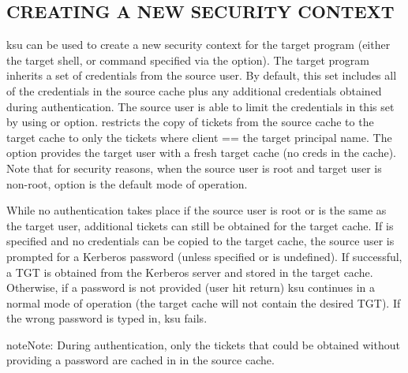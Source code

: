 \documentclass[letterpaper,10pt,english]{sphinxmanual}
\begin{document}
\subsection{CREATING A NEW SECURITY CONTEXT}
\label{\detokenize{user/user_commands/ksu:creating-a-new-security-context}}
ksu can be used to create a new security context for the target
program (either the target shell, or command specified via the 
option).  The target program inherits a set of credentials from the
source user.  By default, this set includes all of the credentials in
the source cache plus any additional credentials obtained during
authentication.  The source user is able to limit the credentials in
this set by using  or  option.   restricts the copy
of tickets from the source cache to the target cache to only the
tickets where client == the target principal name.  The  option
provides the target user with a fresh target cache (no creds in the
cache).  Note that for security reasons, when the source user is root
and target user is non-root,  option is the default mode of
operation.

While no authentication takes place if the source user is root or is
the same as the target user, additional tickets can still be obtained
for the target cache.  If  is specified and no credentials can
be copied to the target cache, the source user is prompted for a
Kerberos password (unless  specified or 
is undefined).  If successful, a TGT is obtained from the Kerberos
server and stored in the target cache.  Otherwise, if a password is
not provided (user hit return) ksu continues in a normal mode of
operation (the target cache will not contain the desired TGT).  If the
wrong password is typed in, ksu fails.

\begin{sphinxadmonition}{note}{Note:}
During authentication, only the tickets that could be
obtained without providing a password are cached in in the
source cache.
\end{sphinxadmonition}
\end{document}
